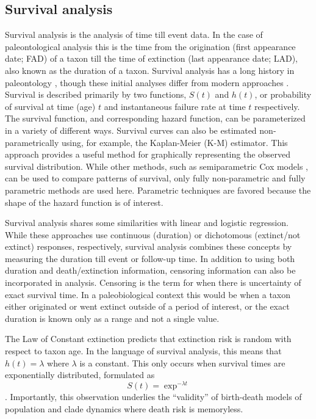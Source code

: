\documentclass[12pt,letterpaper]{article}
\begin{document}
\subsection{Survival analysis} \label{sec:surv}
Survival analysis is the analysis of time till event data. In the case of paleontological analysis this is the time from the origination (first appearance date; FAD) of a taxon till the time of extinction (last appearance date; LAD), also known as the duration of a taxon. Survival analysis has a long history in paleontology \citep{Simpson1944,VanValen1973}, though these initial analyses differ from modern approaches \citep{Kleinbaum2005}. Survival is described primarily by two functions, \(S(t)\) and \(h(t)\), or probability of survival at time (age) \(t\) and instantaneous failure rate at time \(t\) respectively. The survival function, and corresponding hazard function, can be parameterized in a variety of different ways. Survival curves can also be estimated non-parametrically using, for example, the Kaplan-Meier (K-M) estimator. This approach provides a useful method for graphically representing the observed survival distribution. While other methods, such as semiparametric Cox models \citep{Kleinbaum2005}, can be used to compare patterns of survival, only fully non-parametric and fully parametric methods are used here. Parametric techniques are favored because the shape of the hazard function is of interest.

Survival analysis shares some similarities with linear and logistic regression. While these approaches use continuous (duration) or dichotomous (extinct/not extinct) responses, respectively, survival analysis combines these concepts by measuring the duration till event or follow-up time. In addition to using both duration and death/extinction information, censoring information can also be incorporated in analysis. Censoring is the term for when there is uncertainty of exact survival time. In a paleobiological context this would be when a taxon either originated or went extinct outside of a period of interest, or the exact duration is known only as a range and not a single value.

The Law of Constant extinction \citep{VanValen1973} predicts that extinction risk is random with respect to taxon age. In the language of survival analysis, this means that \(h(t) = \lambda\) where \(\lambda\) is a constant. This only occurs when survival times are exponentially distributed, formulated as 
\begin{equation}
  S(t) = \exp ^{- \lambda t}
  \label{eq:expsurv}
\end{equation}. Importantly, this observation underlies the ``validity'' of birth-death models of population and clade dynamics where death risk is memoryless.
\end{document}
